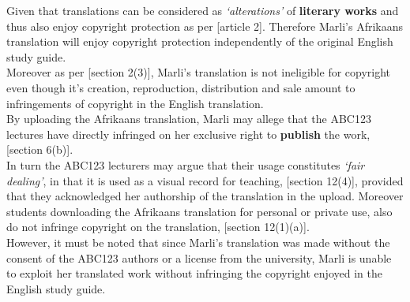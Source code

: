 \documentclass[11pt]{article}
\begin{document}
Given that translations can be considered as \emph{`alterations'} of
\textbf{literary works} and thus also enjoy copyright protection as per
[article 2]\cite{wipo86_berne}. Therefore Marli's Afrikaans translation
will enjoy copyright protection independently of the original English
study guide.\\

Moreover as per [section 2(3)]\cite{rsa78_copyrightact}, Marli's
translation is not ineligible for copyright even though it's creation,
reproduction, distribution and sale amount to infringements of
copyright in the English translation.\\

By uploading the Afrikaans translation, Marli may allege that the
ABC123 lectures have directly infringed on her exclusive right to \textbf{publish}
the work, [section 6(b)]\cite{rsa78_copyrightact}.\\

In turn the ABC123 lecturers may argue that their usage constitutes \emph{`fair
dealing'}, in that it is used as a visual record for teaching, [section
12(4)]\cite{rsa78_copyrightact}, provided that they acknowledged her authorship of
the translation in the upload. Moreover students downloading the Afrikaans
translation for personal or private use, also do not infringe copyright on the
translation, [section 12(1)(a)]\cite{rsa78_copyrightact}.\\

However, it must be noted that since Marli's translation was made
without the consent of the ABC123 authors or a license from the
university, Marli is unable to exploit her translated work without
infringing the copyright enjoyed in the English study guide.
\printbibliography
\end{document}

